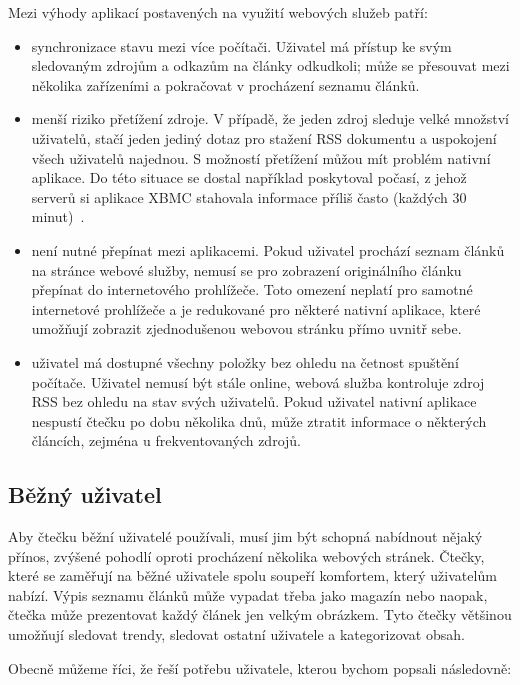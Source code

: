 Mezi výhody aplikací postavených na využití webových služeb patří:
\begin{itemize}
    \item synchronizace stavu mezi více počítači.
        Uživatel má přístup ke svým sledovaným zdrojům a odkazům na články odkudkoli; může se přesouvat mezi několika zařízeními a pokračovat v procházení seznamu článků.
    \item menší riziko přetížení zdroje.
        V případě, že jeden zdroj sleduje velké množství uživatelů, stačí jeden jediný dotaz pro stažení RSS dokumentu a uspokojení všech uživatelů najednou.
        S možností přetížení můžou mít problém nativní aplikace.
		Do této situace se dostal například poskytoval počasí, z jehož serverů si aplikace XBMC stahovala informace příliš často (každých 30 minut)~\cite{xbmc-weather}.
    \item není nutné přepínat mezi aplikacemi.
        Pokud uživatel prochází seznam člán\-ků na stránce webové služby, nemusí se pro zobrazení originálního článku přepínat do internetového prohlížeče.
        Toto omezení neplatí pro samotné internetové prohlížeče a je redukované pro některé nativní aplikace, které umožňují zobrazit zjednodušenou webovou stránku přímo uvnitř sebe.
    \item uživatel má dostupné všechny položky bez ohledu na četnost spuštění počítače.
        Uživatel nemusí být stále online, webová služba kontroluje zdroj RSS bez ohledu na stav svých uživatelů.
        Pokud uživatel nativní aplikace nespustí čtečku po dobu několika dnů, může ztratit informace o některých článcích, zejména u frekventovaných zdrojů.
\end{itemize}

\bigskip

\subsection{Běžný uživatel}

Aby čtečku běžní uživatelé používali, musí jim být schopná nabídnout nějaký přínos, zvýšené pohodlí oproti procházení několika webových stránek.
Čtečky, které se zaměřují na běžné uživatele spolu soupeří komfortem, který uživatelům nabízí.
Výpis seznamu článků může vypadat třeba jako magazín nebo naopak, čtečka může prezentovat každý článek jen velkým obrázkem.
Tyto čtečky většinou umožňují sledovat trendy, sledovat ostatní uživatele a kategorizovat obsah.

Obecně můžeme říci, že řeší potřebu uživatele, kterou bychom popsali následovně:

